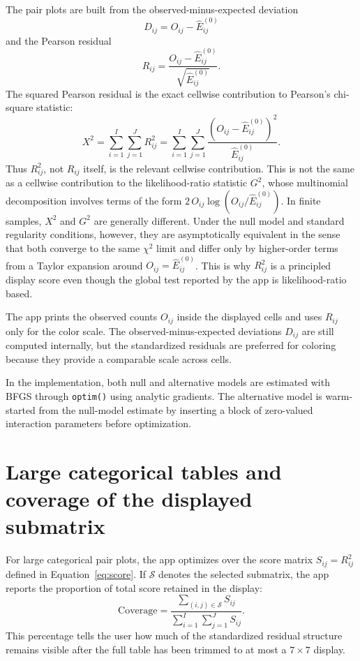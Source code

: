 \documentclass[11pt]{article}
\newcommand{\code}[1]{\texttt{#1}}
\begin{document}
\begin{appendix}
The pair plots are built from the observed-minus-expected deviation
\begin{equation}
D_{ij} = O_{ij} - \widehat{E}^{(0)}_{ij}
\label{eq:app-dij}
\end{equation}
and the Pearson residual
\begin{equation}
R_{ij}
=
\frac{O_{ij} - \widehat{E}^{(0)}_{ij}}
     {\sqrt{\widehat{E}^{(0)}_{ij}}}.
\label{eq:app-rij}
\end{equation}
The squared Pearson residual is the exact cellwise contribution to Pearson's
chi-square statistic:
\begin{equation}
X^2
=
\sum_{i=1}^{I}\sum_{j=1}^{J} R_{ij}^2
=
\sum_{i=1}^{I}\sum_{j=1}^{J}
\frac{\left(O_{ij} - \widehat{E}^{(0)}_{ij}\right)^2}
     {\widehat{E}^{(0)}_{ij}}.
\label{eq:app-x2}
\end{equation}
Thus $R_{ij}^2$, not $R_{ij}$ itself, is the relevant cellwise contribution.
This is not the same as a cellwise contribution to the likelihood-ratio
statistic $G^2$, whose multinomial decomposition involves terms of the form
$2\,O_{ij}\log(O_{ij}/\widehat{E}^{(0)}_{ij})$. In finite samples, $X^2$ and $G^2$ are
generally different. Under the null model and standard regularity conditions,
however, they are asymptotically equivalent in the sense that both converge to
the same $\chi^2$ limit and differ only by higher-order terms from a Taylor
expansion around $O_{ij} = \widehat{E}^{(0)}_{ij}$. This is why $R_{ij}^2$ is a
principled display score even though the global test reported by the app is
likelihood-ratio based.

The app prints the observed counts $O_{ij}$ inside the displayed
cells and uses $R_{ij}$ only for the color scale. The observed-minus-expected
deviations $D_{ij}$ are still computed internally, but the standardized
residuals are preferred for coloring because they provide a comparable scale
across cells.

In the implementation, both null and alternative models are estimated
with BFGS through \code{optim()} using analytic gradients. The alternative
model is warm-started from the null-model estimate by inserting a block of
zero-valued interaction parameters before optimization.

\section{Large categorical tables and coverage of the displayed submatrix}
\label{app:submatrix}

For large categorical pair plots, the app optimizes over the score matrix
$S_{ij} = R_{ij}^2$ defined in Equation~\eqref{eq:score}. If
$\mathcal{S}$ denotes the selected submatrix, the app reports the proportion of
total score retained in the display:
\begin{equation}
\mathrm{Coverage}
=
\frac{\sum_{(i,j)\in\mathcal{S}} S_{ij}}
{\sum_{i=1}^{I}\sum_{j=1}^{J} S_{ij}}.
\label{eq:coverage}
\end{equation}
This percentage tells the user how much of the standardized residual structure
remains visible after the full table has been trimmed to at most a $7 \times 7$
display.


\end{appendix}
\end{document}

